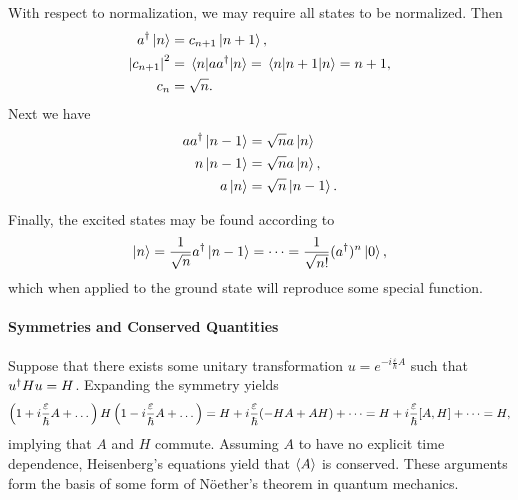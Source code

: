 With respect to normalization, we may require all states to be normalized. Then
\begin{align*}
	a^{\dagger}\ket{n}      &= c_{n + 1}\ket{n + 1}, \\
	\abs{c_{n + 1}}^{2} &= \expval{aa^{\dagger}}{n} = \expval{n + 1}{n} = n + 1, \\
	c_{n}               &= \sqrt{n}.
\end{align*}
Next we have
\begin{align*}
	aa^{\dagger}\ket{n - 1} &= \sqrt{n}a\ket{n} \\
	n\ket{n - 1}        &= \sqrt{n}a\ket{n}, \\
	a\ket{n}            &= \sqrt{n}\ket{n - 1}.
\end{align*}

Finally, the excited states may be found according to
\begin{align*}
	\ket{n} = \frac{1}{\sqrt{n}}a^{\dagger}\ket{n - 1} = \dots = \frac{1}{\sqrt{n!}}(a^{\dagger})^{n}\ket{0},
\end{align*}
which when applied to the ground state will reproduce some special function.

\paragraph{Symmetries and Conserved Quantities}
Suppose that there exists some unitary transformation $u = e^{-i\frac{\varepsilon}{\hbar}A}$ such that $u^{\dagger}Hu = H$. Expanding the symmetry yields
\begin{align*}
	\left(1 + i\frac{\varepsilon}{\hbar}A + \dots\right)H\left(1 - i\frac{\varepsilon}{\hbar}A + \dots\right) = H + i\frac{\varepsilon}{\hbar}(-HA + AH) + \dots = H + i\frac{\varepsilon}{\hbar}\comm{A}{H} + \dots = H,
\end{align*}
implying that $A$ and $H$ commute. Assuming $A$ to have no explicit time dependence, Heisenberg's equations yield that $\expval{A}$ is conserved. These arguments form the basis of some form of Nöether's theorem in quantum mechanics.

